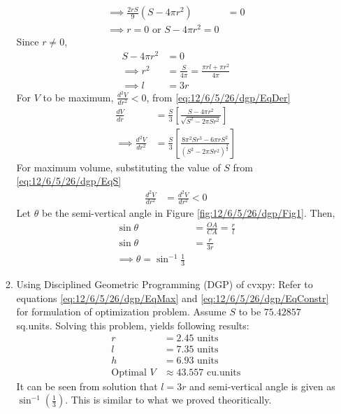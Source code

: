 \documentclass[12pt]{article}
\providecommand{\brak}[1]{\ensuremath{\left(#1\right)}}
\providecommand{\sbrak}[1]{\ensuremath{{}\left[#1\right]}}
\begin{document}
\begin{enumerate}
\begin{enumerate}
\begin{align}
 	\implies  \frac{2rS}{9}\brak{ S- 4\pi r^2} &= 0 \\ 
	\implies r = 0 \text{ or } S - 4\pi r^2 = 0 
\end{align}
Since $r \ne 0$, 
\begin{align}
	S - 4\pi r^2 &= 0 \\
	\label{eq:12/6/5/26/dgp/EqS}
	\implies r^2 &= \frac{S}{4\pi} 
	= \frac{\pi rl+\pi r^2}{4\pi} \\
	\implies l &= 3r 
\end{align}
For $V$ to be maximum, $\frac{d^2V}{dr^2} < 0$, from \eqref{eq:12/6/5/26/dgp/EqDer}
\begin{align}
	\frac{dV}{dr} &= \frac{S}{3}\sbrak{\frac{S-4\pi r^2}{\sqrt{S^2-2\pi Sr^2}}} \\ 
	\implies \frac{d^2V}{dr^2} 
	&=  \frac{S}{3}\sbrak{\frac{8\pi^2Sr^3-6\pi rS^2}{\brak{S^2-2\pi Sr^2}^\frac{3}{2}}} 
\end{align}
For maximum volume, substituting the value of $S$ from \eqref{eq:12/6/5/26/dgp/EqS} 
\begin{align}
	\frac{d^2V}{dr^2} &= \frac{d^2V}{dr^2} < 0 
\end{align}
Let $\theta$ be the semi-vertical angle in Figure \ref{fig:12/6/5/26/dgp/Fig1}. Then,
\begin{align}
	\sin\theta &= \frac{OA}{CA} = \frac{r}{l} \\
	\sin\theta &= \frac{r}{3r} \\
	\implies \theta = \sin^{-1}\frac{1}{3}
\end{align}
\item Using Disciplined Geometric Programming (DGP) of cvxpy: Refer to equations \eqref{eq:12/6/5/26/dgp/EqMax} and \eqref{eq:12/6/5/26/dgp/EqConstr} for formulation of optimization problem. Assume $S$ to be $75.42857$ sq.units. Solving this problem, yields following results:
\begin{align}
	r &= 2.45 \text{ units} \\
	l &= 7.35 \text{ units} \\
	h &= 6.93 \text{ units} \\
	\text{Optimal } V &\approx 43.557 \text{ cu.units}
\end{align}
It can be seen from solution that $l = 3r$ and semi-vertical angle is given as $\sin^{-1}\brak{\frac{1}{3}}$. This is similar to what we proved theoritically.
\end{enumerate}
\begin{figure}[!h]
	\begin{center}

\end{center}
\end{figure}
\end{enumerate}
\end{document}
